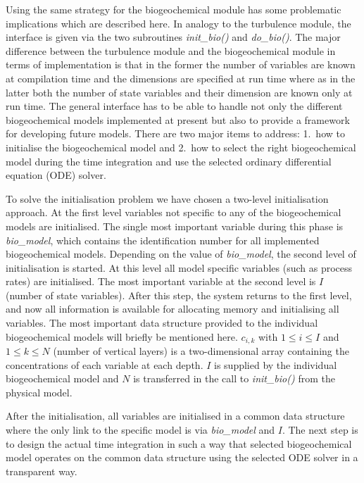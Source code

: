 Using the same strategy for the biogeochemical module 
has some problematic implications which are described here.
In analogy to the turbulence
module, the interface is given via the two subroutines \emph{init\_bio()} and 
\emph{do\_bio()}.
The major difference between the turbulence module and the 
biogeochemical module
in terms of implementation
is that in the former the number of variables are known at compilation time
and the dimensions are specified at run time where as in the latter both 
the number of state variables and their dimension are known only at run time.
The general interface has to be able to handle not only the different 
biogeochemical models implemented at present but also to provide a framework
for developing future models. There are two major
items to address: 1.\ how to initialise the biogeochemical model and 2.\ how to 
select the right biogeochemical model during the time integration and use the 
selected ordinary differential equation (ODE) solver.

To solve the initialisation problem we have chosen a two-level initialisation
approach.  At the first level variables not specific to any of the 
biogeochemical 
models are initialised. The single most important variable during this 
phase is \emph{bio\_model}, which contains the identification number for all
implemented biogeochemical models. 
Depending on the value of \emph{bio\_model}, the second level
of initialisation is started. At this level all model specific variables
(such as process rates) are initialised.
The most important variable at the second
level is $I$ (number of state variables). 
After this step, the system returns to the first level, and
now all information is available for allocating memory and initialising 
all variables. The most important data structure provided to the individual 
biogeochemical models will briefly be mentioned here. $c_{i,k}$ 
with $1\leq i\leq I$ and $1\leq k\leq N$ (number of vertical layers)
is a two-dimensional array containing the concentrations of each 
variable at each depth. $I$ is  
supplied by the individual biogeochemical model and $N$
is transferred in the call to \emph{init\_bio()} from the physical model. 

After the initialisation, all variables are initialised in a common
data structure where the only link to the specific model is via 
\emph{bio\_model} and $I$. The next step is to design the actual
time integration in such a way that selected biogeochemical model 
operates on the 
common data structure using the selected ODE solver in a transparent way.

